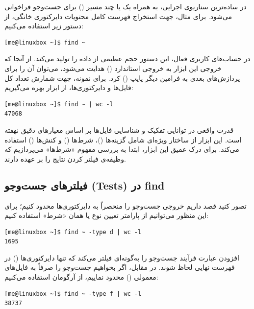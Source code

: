 در ساده‌ترین سناریوی اجرایی،  به همراه یک یا چند مسیر () برای جست‌وجو فراخوانی می‌شود. برای مثال، جهت استخراج فهرست کامل محتویات دایرکتوری خانگی، از دستور زیر استفاده می‌کنیم:

\begin{latin}
\begin{lstlisting}
[me@linuxbox ~]$ find ~
\end{lstlisting}
\end{latin}

در حساب‌های کاربری فعال، این دستور حجم عظیمی از داده را تولید می‌کند. از آنجا که خروجی این ابزار به خروجی استاندارد () هدایت می‌شود، می‌توان آن را برای پردازش‌های بعدی به فرامین دیگر پایپ () کرد. برای نمونه، جهت شمارش تعداد کل فایل‌ها و دایرکتوری‌ها، از ابزار  بهره می‌گیریم:

\begin{latin}
\begin{lstlisting}
[me@linuxbox ~]$ find ~ | wc -l
47068
\end{lstlisting}
\end{latin}

قدرت واقعی  در توانایی تفکیک و شناسایی فایل‌ها بر اساس معیارهای دقیق نهفته است. این ابزار از ساختار ویژه‌ای شامل گزینه‌ها ()، شرط‌ها () و کنش‌ها () استفاده می‌کند. برای درک عمیق این ابزار، ابتدا به بررسی مفهوم «شرط‌ها» می‌پردازیم که وظیفه‌ی فیلتر کردن نتایج را بر عهده دارند.

\subsection{فیلترهای جست‌وجو (Tests) در find}

تصور کنید قصد داریم خروجی جست‌وجو را منحصراً به دایرکتوری‌ها محدود کنیم؛ برای این منظور می‌توانیم از پارامتر تعیین نوع یا همان «شرط»  استفاده کنیم:

\begin{latin}
\begin{lstlisting}
[me@linuxbox ~]$ find ~ -type d | wc -l
1695
\end{lstlisting}
\end{latin}

افزودن عبارت  فرآیند جست‌وجو را به‌گونه‌ای فیلتر می‌کند که تنها دایرکتوری‌ها () در فهرست نهایی لحاظ شوند. در مقابل، اگر بخواهیم جست‌وجو را صرفاً به فایل‌های معمولی () محدود نماییم، از آرگومان  استفاده می‌کنیم:

\begin{latin}
\begin{lstlisting}
[me@linuxbox ~]$ find ~ -type f | wc -l
38737
\end{lstlisting}
\end{latin}

